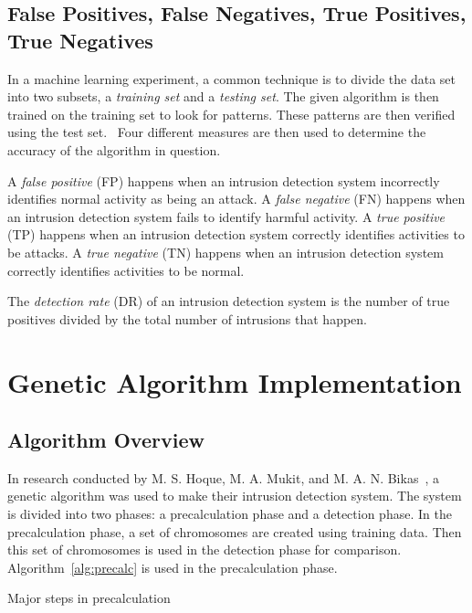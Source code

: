 \documentclass{sig-alternate}
\begin{document}
\subsection{False Positives, False Negatives, True Positives, True Negatives}
\label{sec:PosNeg}
In a machine learning experiment, a common technique is to divide the data set into two subsets, a \emph{training set} and a \emph{testing set}. The given algorithm is then trained on the training set to look for patterns. These patterns are then verified using the test set.~\cite{bc1_ecindm} Four different measures are then used to determine the accuracy of the algorithm in question.

A \emph{false positive} (FP) happens when an intrusion detection system incorrectly identifies normal activity as being an attack. A \emph{false negative} (FN) happens when an intrusion detection system fails to identify harmful activity. A \emph{true positive} (TP) happens when an intrusion detection system correctly identifies activities to be attacks. A \emph{true negative} (TN) happens when an intrusion detection system correctly identifies activities to be normal.

The \emph{detection rate} (DR) of an intrusion detection system is the number of true positives divided by the total number of intrusions that happen.~\cite{ids}




\section{Genetic Algorithm Implementation}
\label{sec:genAlgImp}

\subsection{Algorithm Overview}
In research conducted by M. S. Hoque, M. A. Mukit, and M. A. N. Bikas~\cite{DBLP:journals/corr/abs-1204-1336}, a genetic algorithm was used to make their intrusion detection system. The system is divided into two phases: a precalculation phase and a detection phase. In the precalculation phase, a set of chromosomes are created using training data. Then this set of chromosomes is used in the detection phase for comparison. Algorithm~\ref{alg:precalc} is used in the precalculation phase.

\begin{algorithm}
\caption{Major steps in precalculation}
\label{alg:precalc}
\begin{algorithmic}
  \ELSE {}
  \ENDIF
\ENDFOR
\end{algorithmic}
\end{algorithm}
\end{document}
